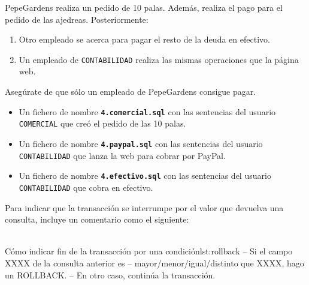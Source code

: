 \newpage

\begin{homeworkProblem}
  PepeGardens realiza un pedido de 10 palas. Además, realiza el pago para el pedido de las ajedreas. Posteriormente:

  {

    \begin{enumerate}
    \item Otro empleado se acerca para pagar el resto de la deuda en efectivo.
    \item Un empleado de \texttt{CONTABILIDAD} realiza las mismas operaciones que la página web.
    \end{enumerate}
  }
  Asegúrate de que sólo un empleado de PepeGardens consigue pagar.
  \begin{Aviso}
    \begin{itemize}
    \item Un fichero de nombre \texttt{\textbf{4.comercial.sql}} con las sentencias del usuario \texttt{COMERCIAL} que creó el pedido de las 10 palas.
    \item Un fichero de nombre \texttt{\textbf{4.paypal.sql}}  con las sentencias del usuario \texttt{CONTABILIDAD} que lanza la web para cobrar por PayPal.
    \item Un fichero de nombre \texttt{\textbf{4.efectivo.sql}}  con las sentencias del usuario \texttt{CONTABILIDAD} que cobra en efectivo.
    \end{itemize}

    Para indicar que la transacción se interrumpe por el valor que devuelva una consulta, incluye un comentario como el siguiente:
    \\
    \\
\begin{listadosql}{Cómo indicar fin de la transacción por una condición}{lst:rollback}
-- Si el campo XXXX de la consulta anterior es
-- mayor/menor/igual/distinto que XXXX, hago un ROLLBACK.
-- En otro caso, continúa la transacción.
\end{listadosql}

  \end{Aviso}

\end{homeworkProblem}

